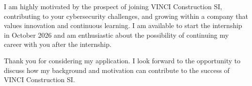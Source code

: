 \documentclass[11pt, a4paper]{awesome-cv}
\begin{document}
\begin{cvletter}
    I am highly motivated by the prospect of joining VINCI Construction SI, contributing to your cybersecurity challenges, and growing within a company that values innovation and continuous learning. I am available to start the internship in October 2026 and am enthusiastic about the possibility of continuing my career with you after the internship.

    Thank you for considering my application. I look forward to the opportunity to discuss how my background and motivation can contribute to the success of VINCI Construction SI.

\end{cvletter}


\makeletterclosing
\end{document}
